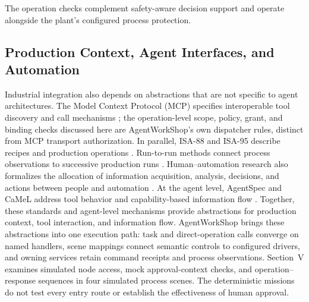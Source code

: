 The operation checks complement safety-aware decision support
\cite{jiang2026agentic} and operate alongside the plant's configured process
protection.

\subsection{Production Context, Agent Interfaces, and Automation}
Industrial integration also depends on abstractions that are not specific to
agent architectures. The Model Context Protocol (MCP) specifies interoperable
tool discovery and call mechanisms \cite{mcp2024}; the operation-level scope,
policy, grant, and binding checks discussed here are AgentWorkShop's own
dispatcher rules, distinct from MCP transport authorization. In parallel,
ISA-88 and ISA-95 describe recipes and production operations
\cite{isa88_2010,isa95_2025}. Run-to-run methods connect process observations
to successive production runs \cite{moyne2000r2r}. Human--automation research
also formalizes the allocation of information acquisition, analysis, decisions,
and actions between people and automation \cite{parasuraman2000model}. At the
agent level, AgentSpec and CaMeL address tool behavior and capability-based
information flow \cite{wang2025agentspec,debenedetti2025camel}. Together, these standards
and agent-level mechanisms provide abstractions for production context, tool
interaction, and information flow. AgentWorkShop brings these abstractions into
one execution path: task and direct-operation calls converge on named handlers,
scene mappings connect semantic controls to configured drivers, and owning
services retain command receipts and process observations. Section~V examines
simulated node access, mock approval-context checks, and operation--response
sequences in four simulated process scenes. The deterministic missions do not
test every entry route or establish the effectiveness of human approval.

